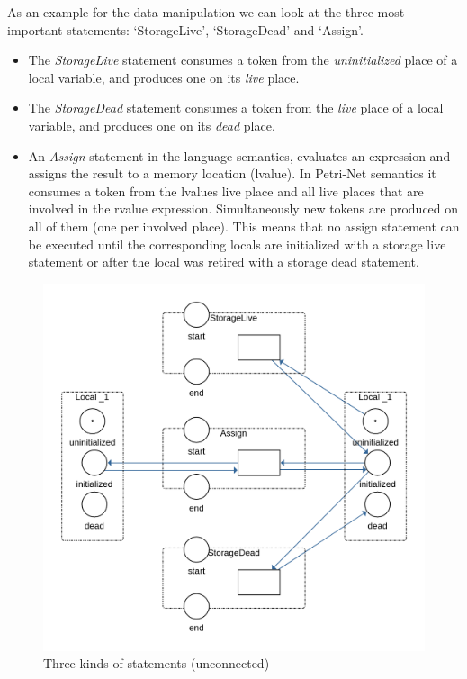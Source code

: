 As an example for the data manipulation we can look at the three most important statements: `StorageLive', `StorageDead' and `Assign'.
\begin{itemize}
    \item The \textit{StorageLive} statement consumes a token from the \textit{uninitialized} place of a local variable, and produces one on its \textit{live} place.
    \item The \textit{StorageDead} statement consumes a token from the \textit{live} place of a local variable, and produces one on its \textit{dead} place.
    \item An \textit{Assign} statement in the language semantics, evaluates an expression and assigns the result to a memory location (lvalue).
    In Petri-Net semantics it consumes a token from the lvalues live place and all live places that are involved in the rvalue expression.
    Simultaneously new tokens are produced on all of them (one per involved place).
    This means that no assign statement can be executed until the corresponding locals are initialized with a storage live statement or after the local was retired with a storage dead statement.
\end{itemize}

\begin{figure}
    \centering
    \includegraphics[width=.9\textwidth]{../diagrams/StatementsNet.png}
    \caption{Three kinds of statements (unconnected)}
    \label{statements_net}
\end{figure}

